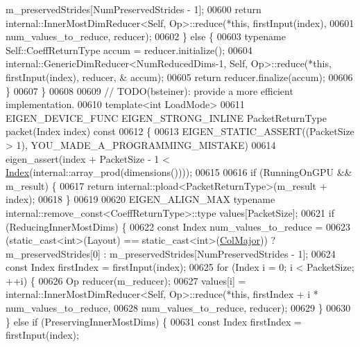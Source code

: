 \begin{DoxyCode}
      m\_preservedStrides[NumPreservedStrides - 1];
00600       \textcolor{keywordflow}{return} internal::InnerMostDimReducer<Self, Op>::reduce(*\textcolor{keyword}{this}, firstInput(index),
00601                                                              num\_values\_to\_reduce, reducer);
00602     \} \textcolor{keywordflow}{else} \{
00603       \textcolor{keyword}{typename} Self::CoeffReturnType accum = reducer.initialize();
00604       internal::GenericDimReducer<NumReducedDims-1, Self, Op>::reduce(*\textcolor{keyword}{this}, firstInput(index), reducer, &
      accum);
00605       \textcolor{keywordflow}{return} reducer.finalize(accum);
00606     \}
00607   \}
00608 
00609   \textcolor{comment}{// TODO(bsteiner): provide a more efficient implementation.}
00610   \textcolor{keyword}{template}<\textcolor{keywordtype}{int} LoadMode>
00611   EIGEN\_DEVICE\_FUNC EIGEN\_STRONG\_INLINE PacketReturnType packet(Index index)\textcolor{keyword}{ const}
00612 \textcolor{keyword}{  }\{
00613     EIGEN\_STATIC\_ASSERT((PacketSize > 1), YOU\_MADE\_A\_PROGRAMMING\_MISTAKE)
00614     eigen\_assert(index + PacketSize - 1 < \hyperlink{namespace_eigen_a62e77e0933482dafde8fe197d9a2cfde}{Index}(internal::array\_prod(dimensions())));
00615 
00616     \textcolor{keywordflow}{if} (RunningOnGPU && m\_result) \{
00617       \textcolor{keywordflow}{return} internal::pload<PacketReturnType>(m\_result + index);
00618     \}
00619 
00620     EIGEN\_ALIGN\_MAX \textcolor{keyword}{typename} internal::remove\_const<CoeffReturnType>::type values[PacketSize];
00621     \textcolor{keywordflow}{if} (ReducingInnerMostDims) \{
00622       \textcolor{keyword}{const} Index num\_values\_to\_reduce =
00623         (\textcolor{keyword}{static\_cast<}\textcolor{keywordtype}{int}\textcolor{keyword}{>}(Layout) == static\_cast<int>(\hyperlink{group__enums_ggaacded1a18ae58b0f554751f6cdf9eb13a0cbd4bdd0abcfc0224c5fcb5e4f6669a}{ColMajor})) ? m\_preservedStrides[0] : 
      m\_preservedStrides[NumPreservedStrides - 1];
00624       \textcolor{keyword}{const} Index firstIndex = firstInput(index);
00625       \textcolor{keywordflow}{for} (Index i = 0; i < PacketSize; ++i) \{
00626         Op reducer(m\_reducer);
00627         values[i] = internal::InnerMostDimReducer<Self, Op>::reduce(*\textcolor{keyword}{this}, firstIndex + i * 
      num\_values\_to\_reduce,
00628                                                                     num\_values\_to\_reduce, reducer);
00629       \}
00630     \} \textcolor{keywordflow}{else} \textcolor{keywordflow}{if} (PreservingInnerMostDims) \{
00631       \textcolor{keyword}{const} Index firstIndex = firstInput(index);

\end{DoxyCode}
